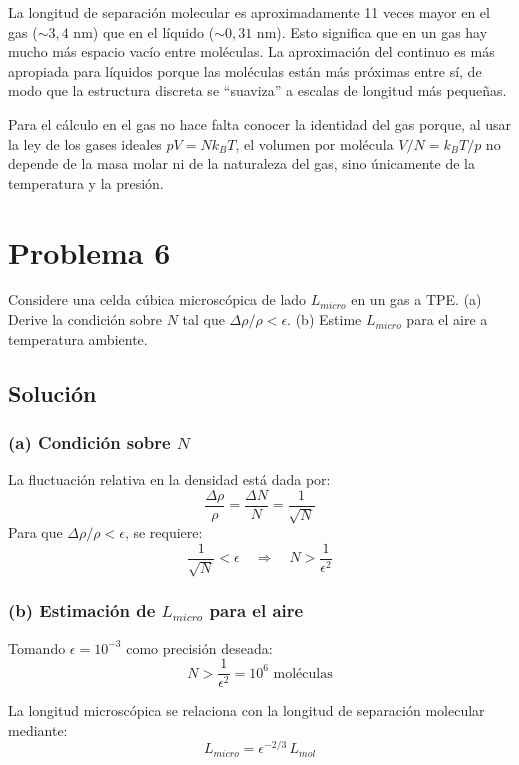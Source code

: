 \documentclass[a4paper]{article}
\begin{document}
La longitud de separación molecular es aproximadamente 11 veces mayor en el gas ($\sim 3{,}4$ nm) que en el líquido ($\sim 0{,}31$ nm). Esto significa que en un gas hay mucho más espacio vacío entre moléculas. La aproximación del continuo es más apropiada para líquidos porque las moléculas están más próximas entre sí, de modo que la estructura discreta se ``suaviza'' a escalas de longitud más pequeñas.

Para el cálculo en el gas no hace falta conocer la identidad del gas porque, al usar la ley de los gases ideales $pV = Nk_B T$, el volumen por molécula $V/N = k_B T/p$ no depende de la masa molar ni de la naturaleza del gas, sino únicamente de la temperatura y la presión.

\section{Problema 6}
Considere una celda cúbica microscópica de lado $L_{micro}$ en un gas a TPE. (a) Derive la condición sobre $N$ tal que $\Delta\rho/\rho < \epsilon$. (b) Estime $L_{micro}$ para el aire a temperatura ambiente.

\subsection{Solución}

\subsubsection{(a) Condición sobre \texorpdfstring{$N$}{N}}

La fluctuación relativa en la densidad está dada por:
$$
\frac{\Delta\rho}{\rho} = \frac{\Delta N}{N} = \frac{1}{\sqrt{N}}
$$
Para que $\Delta\rho/\rho < \epsilon$, se requiere:
$$
\frac{1}{\sqrt{N}} < \epsilon \quad \Longrightarrow \quad N > \frac{1}{\epsilon^2}
$$

\subsubsection{(b) Estimación de \texorpdfstring{$L_{micro}$}{Lmicro} para el aire}

Tomando $\epsilon = 10^{-3}$ como precisión deseada:
$$
N > \frac{1}{\epsilon^2} = 10^6 \text{ moléculas}
$$

La longitud microscópica se relaciona con la longitud de separación molecular mediante:
$$
L_{micro} = \epsilon^{-2/3}\, L_{mol}
$$
\end{document}
